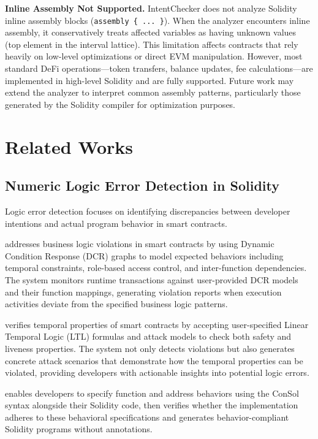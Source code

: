 \documentclass[pdflatex,sn-basic]{sn-jnl}%
\theoremstyle{thmstyleone}%
\theoremstyle{thmstyletwo}%
\theoremstyle{thmstylethree}%
\begin{document}
\smallskip
\noindent\textbf{Inline Assembly Not Supported.}
IntentChecker does not analyze Solidity inline assembly blocks (\texttt{assembly \{ ... \}}).
When the analyzer encounters inline assembly, it conservatively treats affected variables as having unknown values (top element in the interval lattice).
This limitation affects contracts that rely heavily on low-level optimizations or direct EVM manipulation.
However, most standard DeFi operations---token transfers, balance updates, fee calculations---are implemented in high-level Solidity and are fully supported.
Future work may extend the analyzer to interpret common assembly patterns,
particularly those generated by the Solidity compiler for optimization purposes.

\section{Related Works}\label{sec:related}
\subsection{Numeric Logic Error Detection in Solidity}
Logic error detection focuses on identifying discrepancies between developer intentions and actual program behavior in smart contracts.

\citep{highguard} addresses business logic violations in smart contracts by using Dynamic Condition Response (DCR) graphs
to model expected behaviors including temporal constraints, role-based access control, and inter-function dependencies.
The system monitors runtime transactions against user-provided DCR models and their function mappings,
generating violation reports when execution activities deviate from the specified business logic patterns.

\citep{smartpulse} verifies temporal properties of smart contracts by accepting user-specified Linear Temporal Logic (LTL) formulas
and attack models to check both safety and liveness properties.
The system not only detects violations but also generates concrete attack scenarios that demonstrate how the temporal properties can be violated,
providing developers with actionable insights into potential logic errors.

\citep{consolidating} enables developers to specify function and address behaviors using the ConSol syntax alongside their Solidity code,
then verifies whether the implementation adheres to these behavioral specifications and generates behavior-compliant Solidity programs without annotations.
\end{document}
